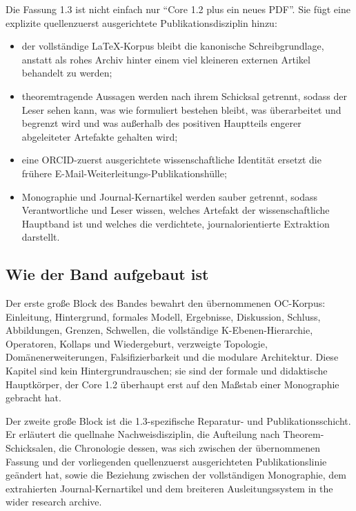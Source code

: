 Die Fassung 1.3 ist nicht einfach nur ``Core 1.2 plus ein neues PDF''.
Sie fügt eine explizite quellenzuerst ausgerichtete Publikationsdisziplin hinzu:

\begin{itemize}
\item der vollständige LaTeX-Korpus bleibt die kanonische Schreibgrundlage, anstatt als
      rohes Archiv hinter einem viel kleineren externen Artikel behandelt zu werden;
\item theoremtragende Aussagen werden nach ihrem Schicksal getrennt, sodass der Leser sehen kann,
      was wie formuliert bestehen bleibt, was überarbeitet und begrenzt wird und was außerhalb des
      positiven Hauptteils engerer abgeleiteter Artefakte gehalten wird;
\item eine ORCID-zuerst ausgerichtete wissenschaftliche Identität ersetzt die frühere
      E-Mail-Weiterleitungs-Publikationshülle;
\item Monographie und Journal-Kernartikel werden sauber getrennt, sodass Verantwortliche und
      Leser wissen, welches Artefakt der wissenschaftliche Hauptband ist und welches die
      verdichtete, journalorientierte Extraktion darstellt.
\end{itemize}

\subsection{Wie der Band aufgebaut ist}

Der erste große Block des Bandes bewahrt den übernommenen OC-Korpus: Einleitung, Hintergrund,
formales Modell, Ergebnisse, Diskussion, Schluss, Abbildungen, Grenzen, Schwellen, die
vollständige K-Ebenen-Hierarchie, Operatoren, Kollaps und Wiedergeburt, verzweigte Topologie,
Domänenerweiterungen, Falsifizierbarkeit und die modulare Architektur. Diese Kapitel sind kein
Hintergrundrauschen; sie sind der formale und didaktische Hauptkörper, der Core 1.2 überhaupt erst
auf den Maßstab einer Monographie gebracht hat.

Der zweite große Block ist die 1.3-spezifische Reparatur- und Publikationsschicht.
Er erläutert die quellnahe Nachweisdisziplin, die Aufteilung nach Theorem-Schicksalen, die
Chronologie dessen, was sich zwischen der übernommenen Fassung und der vorliegenden
quellenzuerst ausgerichteten Publikationslinie geändert hat, sowie die Beziehung zwischen der
vollständigen Monographie, dem extrahierten Journal-Kernartikel und dem breiteren
Ausleitungssystem in the wider research archive.

